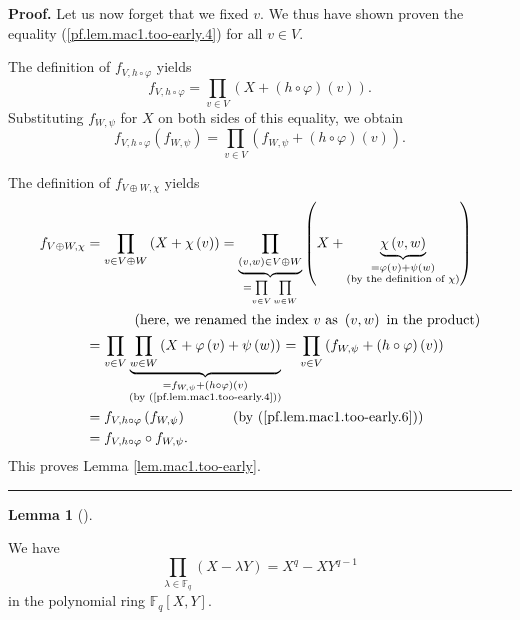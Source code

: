 \documentclass[numbers=enddot,12pt,final,onecolumn,notitlepage]{scrartcl}%
\theoremstyle{definition}
\newtheorem{lem}[theo]{Lemma}
\newenvironment{lemma}[1][]
{\begin{lem}[#1]\begin{leftbar}}
{\end{leftbar}\end{lem}}
\newenvironment{proof}[1][Proof]{\noindent\textbf{#1.} }{\ \rule{0.5em}{0.5em}}
\let\prodnonlimits\prod
\renewcommand{\prod}{\prodnonlimits\limits}
\begin{document}
\begin{proof}
Let us now forget that we fixed $v$. We thus have shown proven the equality
(\ref{pf.lem.mac1.too-early.4}) for all $v\in V$.

The definition of $f_{V,h\circ\varphi}$ yields%
\[
f_{V,h\circ\varphi}=\prod_{v\in V}\left(  X+\left(  h\circ\varphi\right)
\left(  v\right)  \right)  .
\]
Substituting $f_{W,\psi}$ for $X$ on both sides of this equality, we obtain%
\begin{equation}
f_{V,h\circ\varphi}\left(  f_{W,\psi}\right)  =\prod_{v\in V}\left(
f_{W,\psi}+\left(  h\circ\varphi\right)  \left(  v\right)  \right)  .
\label{pf.lem.mac1.too-early.6}%
\end{equation}


The definition of $f_{V\oplus W,\chi}$ yields%
\begin{align*}
f_{V\oplus W,\chi}  &  =\prod_{v\in V\oplus W}\left(  X+\chi\left(  v\right)
\right)  =\underbrace{\prod_{\left(  v,w\right)  \in V\oplus W}}_{=\prod_{v\in
V}\prod_{w\in W}}\left(  X+\underbrace{\chi\left(  v,w\right)  }%
_{\substack{=\varphi\left(  v\right)  +\psi\left(  w\right)  \\\text{(by the
definition of }\chi\text{)}}}\right) \\
&  \ \ \ \ \ \ \ \ \ \ \left(  \text{here, we renamed the index }v\text{ as
}\left(  v,w\right)  \text{ in the product}\right) \\
&  =\prod_{v\in V}\underbrace{\prod_{w\in W}\left(  X+\varphi\left(  v\right)
+\psi\left(  w\right)  \right)  }_{\substack{=f_{W,\psi}+\left(  h\circ
\varphi\right)  \left(  v\right)  \\\text{(by (\ref{pf.lem.mac1.too-early.4}%
))}}}=\prod_{v\in V}\left(  f_{W,\psi}+\left(  h\circ\varphi\right)  \left(
v\right)  \right) \\
&  =f_{V,h\circ\varphi}\left(  f_{W,\psi}\right)  \ \ \ \ \ \ \ \ \ \ \left(
\text{by (\ref{pf.lem.mac1.too-early.6})}\right) \\
&  =f_{V,h\circ\varphi}\circ f_{W,\psi}.
\end{align*}
This proves Lemma \ref{lem.mac1.too-early}.
\end{proof}

\begin{lemma}
\label{lem.mac1.Xq-X}We have
\begin{equation}
\prod_{\lambda\in\mathbb{F}_{q}}\left(  X-\lambda Y\right)  =X^{q}-XY^{q-1}
\label{eq.lem.mac1.Xq-X.eq}%
\end{equation}
in the polynomial ring $\mathbb{F}_{q}\left[  X,Y\right]  $.
\end{lemma}
\end{document}
